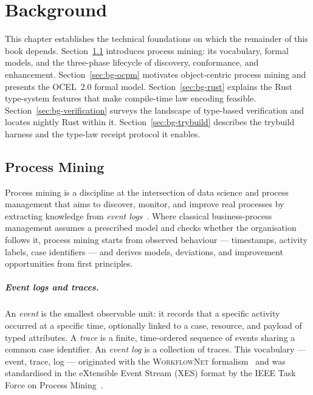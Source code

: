 \chapter{Background}
\label{ch:background}

This chapter establishes the technical foundations on which the remainder of
this book depends. Section~\ref{sec:bg-pm} introduces process mining:
its vocabulary, formal models, and the three-phase lifecycle of discovery,
conformance, and enhancement. Section~\ref{sec:bg-ocpm} motivates
object-centric process mining and presents the OCEL~2.0 formal model.
Section~\ref{sec:bg-rust} explains the Rust type-system features that make
compile-time law encoding feasible. Section~\ref{sec:bg-verification} surveys
the landscape of type-based verification and locates nightly Rust within it.
Section~\ref{sec:bg-trybuild} describes the trybuild harness and the
type-law receipt protocol it enables.

\section{Process Mining}
\label{sec:bg-pm}

Process mining is a discipline at the intersection of data science and process
management that aims to discover, monitor, and improve real processes by
extracting knowledge from \emph{event logs}~\cite{vanderaalst2016process}.
Where classical business-process management assumes a prescribed model and
checks whether the organisation follows it, process mining starts from
observed behaviour --- timestamps, activity labels, case identifiers --- and
derives models, deviations, and improvement opportunities from first
principles.

\paragraph{Event logs and traces.}
An \emph{event} is the smallest observable unit: it records that a specific
activity occurred at a specific time, optionally linked to a case, resource,
and payload of typed attributes. A \emph{trace} is a finite, time-ordered
sequence of events sharing a common case identifier. An \emph{event log} is a
collection of traces. This vocabulary --- event, trace, log --- originated with the
\textsc{WorkflowNet} formalism~\cite{vanderaalst1998application} and was
standardised in the eXtensible Event Stream (\textsc{XES}) format by the
\textsc{IEEE} Task Force on Process Mining~\cite{gunther2014xes}.

